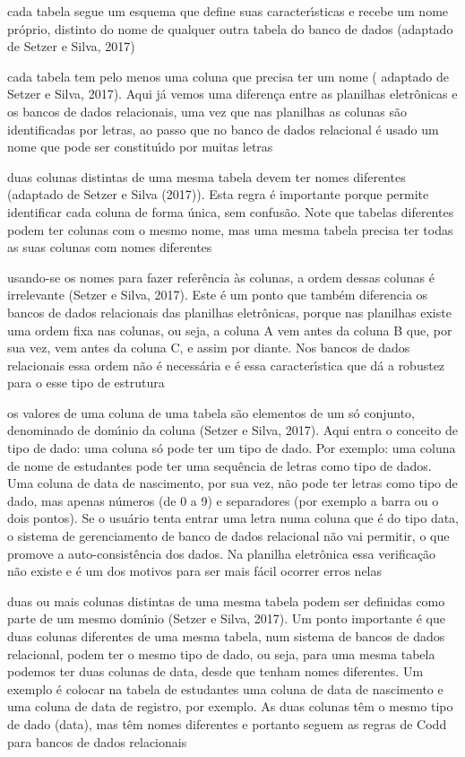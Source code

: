\documentclass[
12pt,		%
openright,	%
twoside,  %
a4paper,			%
chapter=TITLE,		%
english,			%
french,				%
spanish,			%
brazil				%
]{USPSC-classe/USPSC}
\begin{document}
\begin{alineas}
\item cada tabela segue um esquema que define suas caracter\'{\i}sticas e recebe um nome pr\'oprio, distinto do nome de qualquer outra tabela do banco de dados (adaptado de Setzer e Silva, 2017)
\item cada tabela tem pelo menos uma coluna que precisa ter um nome ( adaptado de Setzer e Silva, 2017). Aqui j\'a vemos uma diferen\c{c}a entre as planilhas eletr\^onicas e os bancos de dados relacionais, uma vez que nas planilhas as colunas s\~ao identificadas por letras, ao passo que no banco de dados relacional \'e usado um nome que pode ser constitu\'{\i}do por muitas letras
\item duas colunas distintas de uma mesma tabela devem ter nomes diferentes (adaptado de Setzer e Silva (2017)). Esta regra \'e importante porque permite identificar cada coluna de forma \'unica, sem confus\~ao. Note que tabelas diferentes podem ter colunas com o mesmo nome, mas uma mesma tabela precisa ter todas as suas colunas com nomes diferentes
\item usando-se os nomes para fazer refer\^encia \`as colunas, a ordem dessas colunas \'e irrelevante  (Setzer e Silva, 2017). Este \'e um ponto que tamb\'em diferencia os bancos de dados relacionais das planilhas eletr\^onicas, porque nas planilhas existe uma ordem fixa nas colunas, ou seja, a coluna A vem antes da coluna B que, por sua vez, vem antes da coluna C, e assim por diante. Nos bancos de dados relacionais essa ordem n\~ao \'e necess\'aria e \'e essa caracter\'{\i}stica que d\'a a robustez para o esse tipo de estrutura
\item os valores de uma coluna de uma tabela s\~ao elementos de um s\'o conjunto, denominado de dom\'{\i}nio da coluna  (Setzer e Silva, 2017). Aqui entra o conceito de tipo de dado: uma coluna s\'o pode ter um tipo de dado. Por exemplo: uma coluna de nome de estudantes pode ter uma sequ\^encia de letras como tipo de dados. Uma coluna de data de nascimento, por sua vez, n\~ao pode ter letras como tipo de dado, mas apenas n\'umeros (de 0 a 9) e separadores (por exemplo a barra ou o dois pontos). Se o usu\'ario tenta entrar uma letra numa coluna que \'e do tipo data, o sistema de gerenciamento de banco de dados relacional n\~ao vai permitir, o que promove a auto-consist\^encia dos dados. Na planilha eletr\^onica essa verifica\c{c}\~ao n\~ao existe e \'e um dos motivos para ser mais f\'acil ocorrer erros nelas
\item duas ou mais colunas distintas de uma mesma tabela podem ser definidas como parte de um mesmo dom\'{\i}nio  (Setzer e Silva, 2017). Um ponto importante \'e que duas colunas diferentes de uma mesma tabela, num sistema de bancos de dados relacional, podem ter o mesmo tipo de dado, ou seja, para uma mesma tabela podemos ter duas colunas de data, desde que tenham nomes diferentes. Um exemplo \'e colocar na tabela de estudantes uma coluna de data de nascimento e uma coluna de data de registro, por exemplo. As duas colunas t\^em o mesmo tipo de dado (data), mas t\^em nomes diferentes e portanto seguem as regras de Codd para bancos de dados relacionais

\end{alineas}
\end{document}
